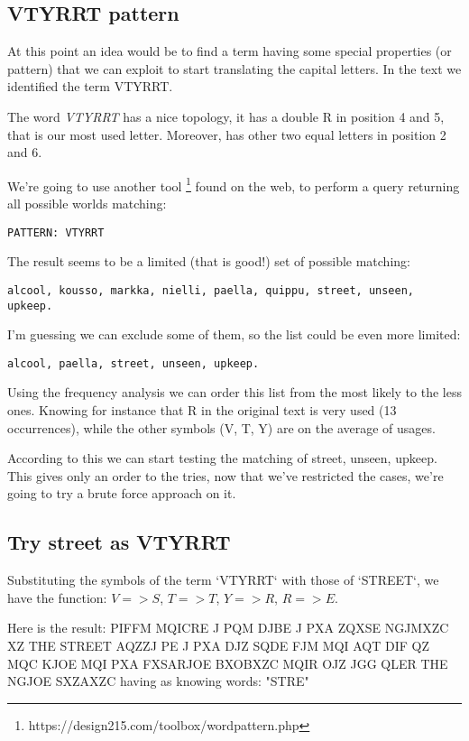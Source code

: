\documentclass{article}
\begin{document}
\subsection{VTYRRT pattern}

At this point an idea would be to find a term having some special properties (or pattern) that we can exploit to start translating the capital letters. In the text we identified the term VTYRRT.

The word \emph{VTYRRT} has a nice topology, it has a double R in position 4 and 5, that is our most used letter. Moreover, has other two equal letters in position 2 and 6.

We're going to use another tool \footnote{https://design215.com/toolbox/wordpattern.php} found on the web, to perform a query returning all possible worlds matching:

\begin{verbatim}
PATTERN: VTYRRT
\end{verbatim}	

The result seems to be a limited (that is good!) set of possible matching:
\begin{verbatim}
alcool, kousso, markka, nielli, paella, quippu, street, unseen, upkeep.
\end{verbatim}	
I'm guessing we can exclude some of them, so the list could be even more limited:
\begin{verbatim}
alcool, paella, street, unseen, upkeep.
\end{verbatim}	
Using the frequency analysis we can order this list from the most likely to the less ones.
Knowing for instance that R in the original text is very used (13 occurrences), while the other symbols (V, T, Y) are on the average of usages.

According to this we can start testing the matching of street, unseen, upkeep.
This gives only an order to the tries, now that we've restricted the cases, we're going to try a brute force approach on it.

\subsection{Try street as VTYRRT}

Substituting the symbols of the term `VTYRRT` with those of `STREET`, we have the function:
$V => S$, $T => T$, $Y => R$, $R => E$.

Here is the result:
\bigbreak
PIFFM MQICRE J PQM DJBE J PXA ZQXSE NGJMXZC XZ THE STREET AQZZJ PE J PXA DJZ SQDE FJM MQI AQT DIF QZ MQC KJOE MQI PXA FXSARJOE BXOBXZC MQIR OJZ JGG QLER THE NGJOE SXZAXZC
\bigbreak
having as knowing words: "STRE"
\end{document}
